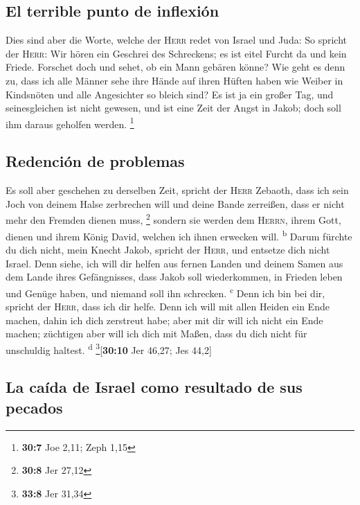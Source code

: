 \hypertarget{el-terrible-punto-de-inflexiuxf3n}{%
\subsection{El terrible punto de
inflexión}\label{el-terrible-punto-de-inflexiuxf3n}}

 Dies sind aber die Worte, welche der \textsc{Herr} redet
von Israel und Juda:  So spricht der \textsc{Herr}: Wir
hören ein Geschrei des Schreckens; es ist eitel Furcht da und kein
Friede.  Forschet doch und sehet, ob ein Mann gebären
könne? Wie geht es denn zu, dass ich alle Männer sehe ihre Hände auf
ihren Hüften haben wie Weiber in Kindsnöten und alle Angesichter so
bleich sind?  Es ist ja ein großer Tag, und seinesgleichen
ist nicht gewesen, und ist eine Zeit der Angst in Jakob; doch soll ihm
daraus geholfen werden. \footnote{\textbf{30:7} Joe 2,11; Zeph 1,15}

\hypertarget{redenciuxf3n-de-problemas}{%
\subsection{Redención de problemas}\label{redenciuxf3n-de-problemas}}

 Es soll aber geschehen zu derselben Zeit, spricht der
\textsc{Herr} Zebaoth, dass ich sein Joch von deinem Halse zerbrechen
will und deine Bande zerreißen, dass er nicht mehr den Fremden dienen
muss, \footnote{\textbf{30:8} Jer 27,12}  sondern sie
werden dem \textsc{Herrn}, ihrem Gott, dienen und ihrem König David,
welchen ich ihnen erwecken will. \textsuperscript{b} 
Darum fürchte du dich nicht, mein Knecht Jakob, spricht der
\textsc{Herr}, und entsetze dich nicht Israel. Denn siehe, ich will dir
helfen aus fernen Landen und deinem Samen aus dem Lande ihres
Gefängnisses, dass Jakob soll wiederkommen, in Frieden leben und Genüge
haben, und niemand soll ihn schrecken. \textsuperscript{c}
 Denn ich bin bei dir, spricht der \textsc{Herr}, dass
ich dir helfe. Denn ich will mit allen Heiden ein Ende machen, dahin ich
dich zerstreut habe; aber mit dir will ich nicht ein Ende machen;
züchtigen aber will ich dich mit Maßen, dass du dich nicht für
unschuldig haltest. \textsuperscript{d} \footnote{\textbf{33:8} Jer
  31,34}{[}\textbf{30:10} Jer 46,27; Jes 44,2{]}

\hypertarget{la-cauxedda-de-israel-como-resultado-de-sus-pecados}{%
\subsection{La caída de Israel como resultado de sus
pecados}\label{la-cauxedda-de-israel-como-resultado-de-sus-pecados}}

